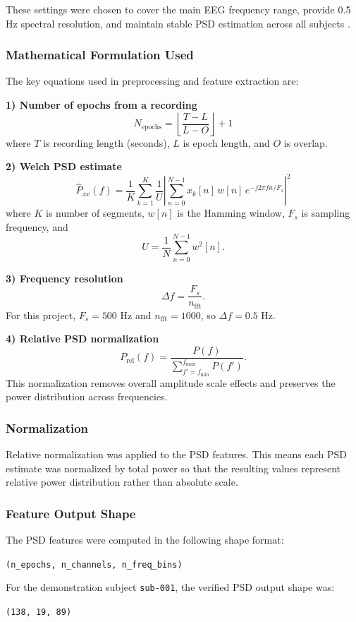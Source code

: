 \documentclass[12pt,a4paper]{article}
\begin{document}
These settings were chosen to cover the main EEG frequency range, provide 0.5 Hz spectral resolution, and maintain stable PSD estimation across all subjects \cite{welch1967,cassani2018}.

\subsubsection{Mathematical Formulation Used}
The key equations used in preprocessing and feature extraction are:

\textbf{1) Number of epochs from a recording}
\[
N_{\text{epochs}}=\left\lfloor\frac{T-L}{L-O}\right\rfloor+1
\]
where \(T\) is recording length (seconds), \(L\) is epoch length, and \(O\) is overlap.

\textbf{2) Welch PSD estimate}
\[
\hat{P}_{xx}(f)=\frac{1}{K}\sum_{k=1}^{K}\frac{1}{U}\left|\sum_{n=0}^{N-1}x_k[n]\,w[n]\,e^{-j2\pi fn/F_s}\right|^2
\]
where \(K\) is number of segments, \(w[n]\) is the Hamming window, \(F_s\) is sampling frequency, and
\[
U=\frac{1}{N}\sum_{n=0}^{N-1}w^2[n].
\]

\textbf{3) Frequency resolution}
\[
\Delta f=\frac{F_s}{n_{\text{fft}}}.
\]
For this project, \(F_s=500\) Hz and \(n_{\text{fft}}=1000\), so \(\Delta f=0.5\) Hz.

\textbf{4) Relative PSD normalization}
\[
P_{\text{rel}}(f)=\frac{P(f)}{\sum\limits_{f'=f_{\min}}^{f_{\max}}P(f')}.
\]
This normalization removes overall amplitude scale effects and preserves the power distribution across frequencies.

\subsubsection{Normalization}
Relative normalization was applied to the PSD features. This means each PSD estimate was normalized by total power so that the resulting values represent relative power distribution rather than absolute scale.

\subsubsection{Feature Output Shape}
The PSD features were computed in the following shape format:
\begin{center}
\texttt{(n\_epochs, n\_channels, n\_freq\_bins)}
\end{center}

For the demonstration subject \texttt{sub-001}, the verified PSD output shape was:
\begin{center}
\texttt{(138, 19, 89)}
\end{center}
\end{document}
